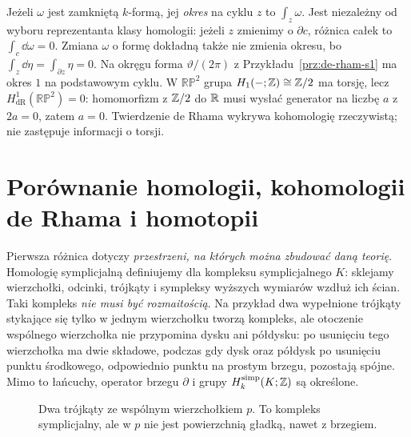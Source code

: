 \begin{przyklad}
Jeżeli $\omega$ jest zamkniętą $k$-formą, jej
\emph{okres} na cyklu $z$ to $\int_z\omega$.
Jest niezależny od wyboru reprezentanta klasy
homologii: jeżeli $z$ zmienimy o $\partial c$,
różnica całek to $\int_c\dd\omega=0$.
Zmiana $\omega$ o formę dokładną także nie zmienia
okresu, bo $\int_z\dd\eta=\int_{\partial z}\eta=0$.
Na okręgu forma $\vartheta/(2\pi)$ z
Przykładu~\ref{prz:de-rham-s1} ma okres $1$ na
podstawowym cyklu. W $\mathbb{RP}^2$ grupa
$H_1(-;\mathbb{Z})\cong\mathbb{Z}/2$ ma torsję, lecz
$H^1_{\mathrm{dR}}(\mathbb{RP}^2)=0$:
homomorfizm z $\mathbb{Z}/2$ do $\mathbb{R}$ musi wysłać
generator na liczbę $a$ z $2a=0$, zatem $a=0$.
Twierdzenie de Rhama wykrywa kohomologię
rzeczywistą; nie zastępuje informacji o torsji.
\end{przyklad}

\section{Porównanie homologii, kohomologii de Rhama i homotopii}
\label{sec:porownanie-trzech-teorii}

Pierwsza różnica dotyczy \emph{przestrzeni, na których
można zbudować daną teorię}. Homologię symplicjalną
definiujemy dla kompleksu symplicjalnego $K$:
sklejamy wierzchołki, odcinki, trójkąty i sympleksy
wyższych wymiarów wzdłuż ich ścian. Taki kompleks
\emph{nie musi być rozmaitością}. Na przykład dwa
wypełnione trójkąty stykające się tylko w jednym
wierzchołku tworzą kompleks, ale otoczenie
wspólnego wierzchołka nie przypomina dysku
ani półdysku: po usunięciu tego wierzchołka ma dwie
składowe, podczas gdy dysk oraz półdysk po usunięciu
punktu środkowego, odpowiednio punktu na prostym brzegu,
pozostają spójne. Mimo to łańcuchy, operator brzegu
$\partial$ i grupy $H_k^{\mathrm{simp}}(K;\mathbb{Z})$
są określone.

\begin{figure}[!htbp]
\centering
{}
\caption{Dwa trójkąty ze wspólnym wierzchołkiem $p$.
To kompleks symplicjalny, ale w $p$ nie jest
powierzchnią gładką, nawet z brzegiem.}
\label{fig:kompleks-nie-rozmaitosc}
\end{figure}

